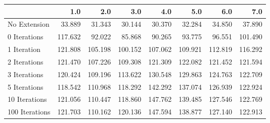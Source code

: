\begin{tabular}{lrrrrrrr}
\toprule
{} &     1.0 &     2.0 &     3.0 &     4.0 &     5.0 &     6.0 &     7.0 \\
\midrule
No Extension   &  33.889 &  31.343 &  30.144 &  30.370 &  32.284 &  34.850 &  37.890 \\
0 Iterations   & 117.632 &  92.022 &  85.868 &  90.265 &  93.775 &  96.551 & 101.490 \\
1 Iteration    & 121.808 & 105.198 & 100.152 & 107.062 & 109.921 & 112.819 & 116.292 \\
2 Iterations   & 121.470 & 107.226 & 109.308 & 121.309 & 122.082 & 121.452 & 121.594 \\
3 Iterations   & 120.424 & 109.196 & 113.622 & 130.548 & 129.863 & 124.763 & 122.709 \\
5 Iterations   & 118.542 & 110.968 & 118.292 & 142.292 & 137.074 & 126.939 & 122.924 \\
10 Iterations  & 121.056 & 110.447 & 118.860 & 147.762 & 139.485 & 127.546 & 122.769 \\
100 Iterations & 121.703 & 110.162 & 120.136 & 147.594 & 138.877 & 127.140 & 122.913 \\
\bottomrule
\end{tabular}
